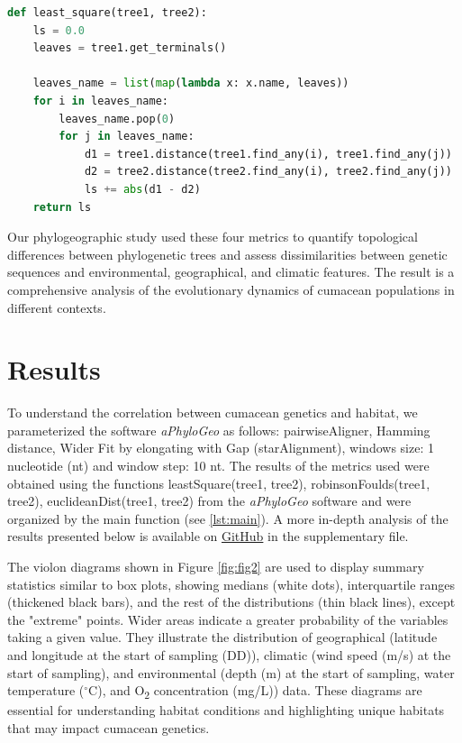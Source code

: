 \begin{lstlisting}[label=lst:LeastSquare, language=Python, caption=Python script for calculating the Least-Square distance using the ete3 package in the aPhyloGeo package]
def least_square(tree1, tree2):
    ls = 0.0
    leaves = tree1.get_terminals()

    leaves_name = list(map(lambda x: x.name, leaves))
    for i in leaves_name:
        leaves_name.pop(0)
        for j in leaves_name:
            d1 = tree1.distance(tree1.find_any(i), tree1.find_any(j))
            d2 = tree2.distance(tree2.find_any(i), tree2.find_any(j))
            ls += abs(d1 - d2)
    return ls
\end{lstlisting}

Our phylogeographic study used these four metrics to quantify topological differences between phylogenetic trees and assess dissimilarities between genetic sequences and environmental, geographical, and climatic features. The result is a comprehensive analysis of the evolutionary dynamics of cumacean populations in different contexts.

\section{Results}\label{results}
To understand the correlation between cumacean genetics and habitat, we parameterized the software \textit{aPhyloGeo} as follows: pairwiseAligner, Hamming distance, Wider Fit by elongating with Gap (starAlignment), windows size: 1 nucleotide (nt) and window step: 10 nt. The results of the metrics used were obtained using the functions leastSquare(tree1, tree2), robinsonFoulds(tree1, tree2), euclideanDist(tree1, tree2) from the \textit{aPhyloGeo} software and were organized by the main function (see \autoref{lst:main}). A more in-depth analysis of the results presented below is available on \href{https://github.com/tahiri-lab/Cumacea_aPhyloGeo}{GitHub} in the supplementary file.

The violon diagrams shown in Figure \ref{fig:fig2} are used to display summary statistics similar to box plots, showing medians (white dots), interquartile ranges (thickened black bars), and the rest of the distributions (thin black lines), except the "extreme" points. Wider areas indicate a greater probability of the variables taking a given value. They illustrate the distribution of geographical (latitude and longitude at the start of sampling (DD)), climatic (wind speed (m/s) at the start of sampling), and environmental (depth (m) at the start of sampling, water temperature ($^\circ$C), and O\textsubscript{2} concentration (mg/L)) data. These diagrams are essential for understanding habitat conditions and highlighting unique habitats that may impact cumacean genetics. 

